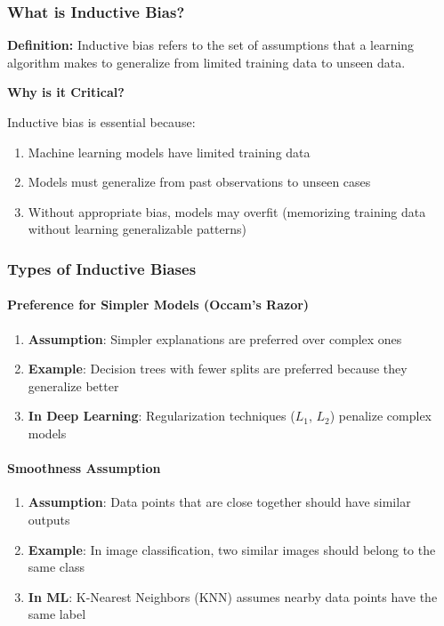 \subsubsection{What is Inductive Bias?}
\label{subsubsec:what-is-inductive-bias}

\textbf{Definition:} Inductive bias refers to the set of assumptions that a learning algorithm makes to generalize from limited training data to unseen data.

\textbf{Why is it Critical?}

Inductive bias is essential because:

\begin{enumerate}
\item Machine learning models have limited training data
\item Models must generalize from past observations to unseen cases  
\item Without appropriate bias, models may overfit (memorizing training data without learning generalizable patterns)
\end{enumerate}

\subsubsection{Types of Inductive Biases}
\label{subsubsec:types-inductive-bias}

\paragraph{Preference for Simpler Models (Occam's Razor)}
\label{para:occam-razor}

\begin{enumerate}
\item \textbf{Assumption}: Simpler explanations are preferred over complex ones
\item \textbf{Example}: Decision trees with fewer splits are preferred because they generalize better
\item \textbf{In Deep Learning}: Regularization techniques ($L_1$, $L_2$) penalize complex models
\end{enumerate}

\paragraph{Smoothness Assumption}
\label{para:smoothness-assumption}

\begin{enumerate}
\item \textbf{Assumption}: Data points that are close together should have similar outputs
\item \textbf{Example}: In image classification, two similar images should belong to the same class
\item \textbf{In ML}: K-Nearest Neighbors (KNN) assumes nearby data points have the same label
\end{enumerate}

